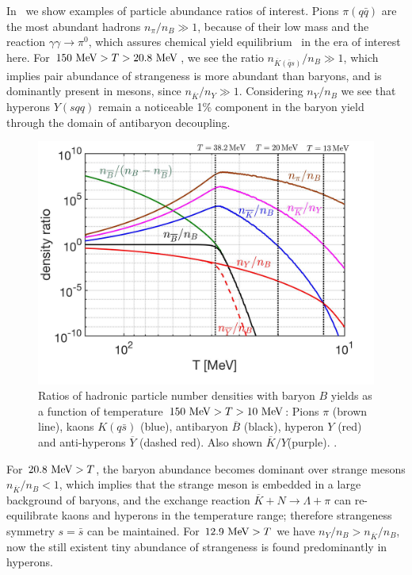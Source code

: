 In~ we show examples of particle abundance ratios of interest. Pions $\pi(q\bar q)$ are the most abundant hadrons $n_\pi/n_B\gg1$, because of their low mass and the reaction $\gamma\gamma\rightarrow\pi^0$, which assures chemical yield equilibrium~\cite{Kuznetsova:2008jt} in the era of interest here. For $150\text{ MeV}>T>20.8\text{ MeV}$, we see the ratio $n_{{\overline K}(\bar q s)}/n_B\gg1$, which implies pair abundance of strangeness is more abundant than baryons, and is dominantly present in mesons, since $n_{\overline K}/n_Y\gg1$.  Considering $n_Y/n_B$ we see that hyperons $Y(sqq)$ remain a noticeable 1\% component in the baryon yield through the domain of antibaryon decoupling.

\begin{figure} 
\centerline{
\includegraphics[width=0.9\linewidth]{./plots/Meson_Baryon_density_ratio_C.jpg}}
\caption{Ratios of hadronic particle number densities  with baryon $B$ yields as a function of temperature $150\text{ MeV}> T>10\text{ MeV}$: Pions $\pi$ (brown line), kaons $K( q\bar s)$ (blue), antibaryon $\overline B$ (black), hyperon $Y$ (red) and anti-hyperons $\overline Y$ (dashed red). Also shown $\overline K/Y$(purple). . }
\label{EquilibPartRatiosFig} 
\end{figure}

For $20.8\text{ MeV}>T$, the  baryon abundance becomes dominant over strange mesons $n_{\overline K}/n_B<1$, which implies that the strange meson is embedded in a large background of baryons, and the exchange reaction $\overline{K}+N\rightarrow \Lambda+\pi$ can re-equilibrate kaons and hyperons in the temperature range; therefore strangeness symmetry $s=\bar s$ can be maintained. For $12.9\text{ MeV}>T$ we have $n_Y/n_B>n_{\overline K}/n_B$, now the still existent tiny abundance of strangeness is found predominantly in hyperons.

